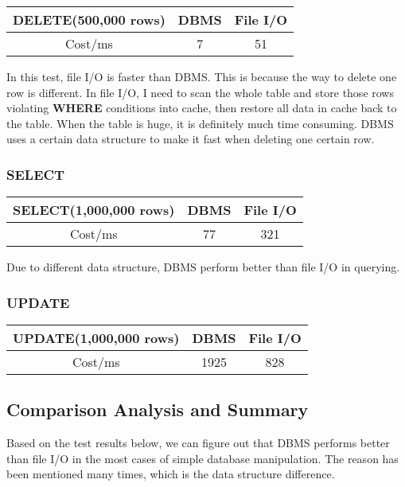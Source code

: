 \documentclass[onecolumn, oneside, ctexart, UTF8, b4paper]{SUSTechHomework}
\begin{document}
\begin{center}
\begin{tabular}{|c|c|c|}
     \hline
     DELETE(500,000 rows) & DBMS & File I/O \\
    \hline
    Cost/ms & 7 & 51 \\
    \hline
\end{tabular}
\end{center}

In this test, file I/O is faster than DBMS. This is because the way to delete one row is different. In file I/O, I need to scan the whole table and store those rows violating \textbf{WHERE} conditions into cache, then restore all data in cache back to the table. When the table is huge, it is definitely much time consuming. DBMS uses a certain data structure to make it fast when deleting one certain row.

\subsubsection{\textbf{SELECT}}

\begin{center}
\begin{tabular}{|c|c|c|}
     \hline
     SELECT(1,000,000 rows) & DBMS & File I/O \\
    \hline
    Cost/ms & 77 & 321 \\
    \hline
\end{tabular}
\end{center}
Due to different data structure, DBMS perform better than file I/O in querying.

\subsubsection{\textbf{UPDATE}}

\begin{center}
\begin{tabular}{|c|c|c|}
     \hline
     UPDATE(1,000,000 rows) & DBMS & File I/O \\
    \hline
    Cost/ms & 1925 & 828 \\
    \hline
\end{tabular}
\end{center}

\subsection{\textbf{Comparison Analysis and Summary}}
Based on the test results below, we can figure out that DBMS performs better than file I/O in the most cases of simple database manipulation. The reason has been mentioned many times, which is the data structure difference.
\end{document}
